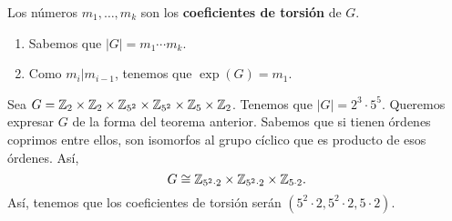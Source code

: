 \begin{definition}
Los números $\displaystyle m_{1}, \ldots, m_{k} $ son los \textbf{coeficientes de torsión} de $\displaystyle G $. 
\end{definition}
\begin{observation}
\begin{enumerate}
\item Sabemos que $\displaystyle \left|G\right| = m_{1} \cdots m_{k} $.
\item Como $\displaystyle m_{i}|m_{i-1} $, tenemos que $\displaystyle \exp\left(G\right) = m_{1} $.
\end{enumerate}
\end{observation}
\begin{eg}
Sea $\displaystyle G = \mathbb{Z}_{2} \times \mathbb{Z}_{2} \times \mathbb{Z}_{5^{2}} \times \mathbb{Z}_{5^{2}} \times \mathbb{Z}_{5} \times \mathbb{Z}_{2} $. Tenemos que $\displaystyle \left|G\right| = 2^{3} \cdot 5^{5} $. Queremos expresar $\displaystyle G $ de la forma del teorema anterior. Sabemos que si tienen órdenes coprimos entre ellos, son isomorfos al grupo cíclico que es producto de esos órdenes. Así,
\[G \cong \mathbb{Z}_{5^{2} \cdot 2} \times \mathbb{Z}_{5^{2} \cdot 2} \times \mathbb{Z}_{5 \cdot 2} .\]
Así, tenemos que los coeficientes de torsión serán $\displaystyle \left(5^{2} \cdot 2, 5^{2} \cdot 2, 5 \cdot 2\right) $. 
\end{eg}

